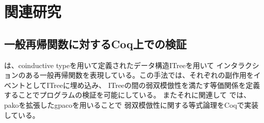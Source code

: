 \documentclass[japanese]{jssst_ppl}
\theoremstyle{definition}
\begin{document}
  \iffalse
    \begin{verbatim}
  |《 rewrite under cnew mlint 1 >>= by bindfwB》|
  factdts_aux n a >> (cget a >>= [eta Ret])
  |《 fixpointE 》|
  cget a >>=
  (fun x : coq_type N ml_int => (cput a (fact n * x) >> Ret tt) >> (cget a >>= [eta Ret]))
  |《 rewrite under cget a >>= by eqbind》|
  (cput a (fact n * x) >> Ret tt) >> (cget a >>= [eta Ret])
  |《 fixpointE 》|
  cput a (fact n * x) >> (cget a >>= [eta Ret])
  |《 over 》|
  cnew ml_int 1 >>=
  (fun a : loc ml_int =>
   cget a >>=
   (fun x : coq_type N ml_int => cput a (fact n * x) >> (cget a >>= [eta Ret])))
   |《 fixpointE 》|
   cnew ml_int (fact n) >>= (fun r : loc ml_int => cget r >>= [eta Ret])

\end{verbatim}
  \fi

  \iffalse
    |《 rewrite under cnew ml_int 1 >>= by bindfwB》|
    factdts_aux n a >> (cget a >>= [eta Ret])
    |《 fixpointE 》|
    cget a >>=
    (fun x : coq_type N ml_int => (cput a (fact n * x) >> Ret tt) >> (cget a >>= [eta Ret]))
    |《 rewrite under cget a >>= by eq_bind》|
    (cput a (fact n * x) >> Ret tt) >> (cget a >>= [eta Ret])
    |《 fixpointE 》|
    cput a (fact n * x) >> (cget a >>= [eta Ret])
    |《 over 》|
    cnew ml_int 1 >>=
    (fun a : loc ml_int =>
    cget a >>=
    (fun x : coq_type N ml_int => cput a (fact n * x) >> (cget a >>= [eta Ret])))
    |《 fixpointE 》|
    cnew ml_int (fact n) >>= (fun r : loc ml_int => cget r >>= [eta Ret])

  \fi
\fi

\section{関連研究}
\subsection{一般再帰関数に対するCoq上での検証}
\cite{10.1145/3371119}は、coinductive typeを用いて定義されたデータ構造ITreeを用いて
インタラクションのある一般再帰関数を表現している。この手法では、それぞれの副作用をイベントとしてITreeに埋め込み、
ITreeの間の弱双模倣性を満たす等価関係を定義することでプログラムの検証を可能にしている。
またそれに関連して
\cite{10.1145/3372885.3373813}では、pakoを拡張したgpacoを用いることで
弱双模倣性に関する等式論理をCoqで実装している。

\end{document}
